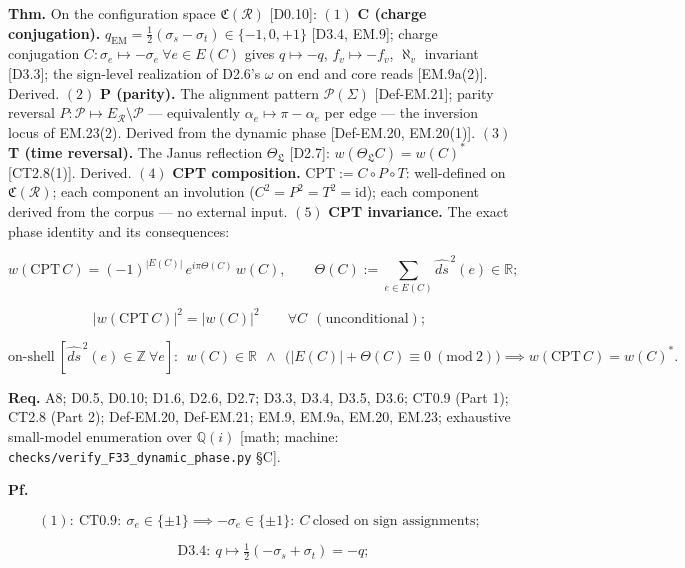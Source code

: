 \begin{theorem}\label{tag:EM-24}
\textbf{Thm.} On the configuration space $\mathfrak C(\mathcal R)$ [D0.10]: $(1)$ \textbf{C (charge conjugation).} $q_{\mathrm{EM}}=\tfrac12(\sigma_s-\sigma_t)\in\{-1,0,+1\}$ [D3.4, EM.9]; charge conjugation $C:\sigma_e\mapsto-\sigma_e\ \forall e\in E(C)$ gives $q\mapsto-q$, $f_v\mapsto-f_v$, $\aleph_v$ invariant [D3.3]; the sign-level realization of D2.6's $\omega$ on end and core reads [EM.9a(2)]. Derived. $(2)$ \textbf{P (parity).} The alignment pattern $\mathcal P(\Sigma)$ [Def-EM.21]; parity reversal $P:\mathcal P\mapsto E_{\mathcal R}\setminus\mathcal P$ — equivalently $\alpha_e\mapsto\pi-\alpha_e$ per edge — the inversion locus of EM.23(2). Derived from the dynamic phase [Def-EM.20, EM.20(1)]. $(3)$ \textbf{T (time reversal).} The Janus reflection $\Theta_{\mathfrak L}$ [D2.7]: $w(\Theta_{\mathfrak L}C)=w(C)^\ast$ [CT2.8(1)]. Derived. $(4)$ \textbf{CPT composition.} $\mathrm{CPT}:=C\circ P\circ T$: well-defined on $\mathfrak C(\mathcal R)$; each component an involution ($C^2=P^2=T^2=\mathrm{id}$); each component derived from the corpus — no external input. $(5)$ \textbf{CPT invariance.} The exact phase identity and its consequences:

\[
w(\mathrm{CPT}\,C)=(-1)^{|E(C)|}\,e^{i\pi\Theta(C)}\,w(C),\qquad\Theta(C):=\!\!\sum_{e\in E(C)}\!\!\widehat{ds}^{\,2}(e)\in\mathbb R;
\]

\[
\bigl|w(\mathrm{CPT}\,C)\bigr|^2=\bigl|w(C)\bigr|^2\qquad\forall C\ \ (\text{unconditional});
\]

\[
\text{on-shell}\ [\widehat{ds}^{\,2}(e)\in\mathbb Z\ \forall e]:\ \ w(C)\in\mathbb R\ \ \wedge\ \ \bigl(|E(C)|+\Theta(C)\equiv0\ (\mathrm{mod}\ 2)\bigr)\implies w(\mathrm{CPT}\,C)=w(C)^\ast .
\]

\textbf{Req.} A8; D0.5, D0.10; D1.6, D2.6, D2.7; D3.3, D3.4, D3.5, D3.6; CT0.9 (Part 1); CT2.8 (Part 2); Def-EM.20, Def-EM.21; EM.9, EM.9a, EM.20, EM.23; exhaustive small-model enumeration over $\mathbb Q(i)$ [math; machine: \texttt{checks/\allowbreak{}verify\_\allowbreak{}F33\_\allowbreak{}dynamic\_\allowbreak{}phase.py} §C].

\textbf{Pf.}

\[
(1):\ \mathrm{CT0.9}:\ \sigma_e\in\{\pm1\}\implies-\sigma_e\in\{\pm1\}:\ C\ \text{closed on sign assignments};
\]

\[
\qquad \mathrm{D3.4}:\ q\mapsto\tfrac12(-\sigma_s+\sigma_t)=-q;
\]


\end{theorem}
